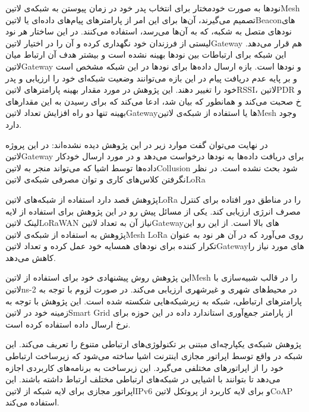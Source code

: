 نودها به صورت خودمختار برای انتخاب پدر خود در زمان پیوستن به شبکه‌ی ‌لاتین{Mesh} تصمیم می‌گیرند، آن‌ها برای این امر از پارامترهای پیام‌های داده‌ای یا ‌لاتین{Beacon}های نودهای متصل به شکبه، که به آن‌ها می‌رسد، استفاده می‌کنند.
در این ساختار هر نود لیستی از فرزندان خود نگهداری کرده و آن را در اختیار ‌لاتین{‌Gateway} هم قرار می‌دهد.
این شبکه برای ارتباطات بین نودها بهینه نشده است و بیشتر هدف آن ارتباط میان ‌لاتین{Gateway} و نودها است.
بازه ارسال داده‌ها برای نودها در این شبکه مشخص است و بر پایه عدم دریافت پیام در این بازه می‌توانند وضعیت شبکه‌ای خود را ارزیابی و پدر خود را تغییر دهند.
این پژوهش در مورد مقدار بهینه پارامترهای ‌لاتین{RSSI}، ‌لاتین{PDR} و ‌خ صحبت می‌کند و همانطور که بیان شد، ادعا می‌کند که برای رسیدن به این مقدارهای بهینه تنها دو راه افزایش تعداد ‌لاتین{Gateway}ها یا استفاده از شبکه‌ی ‌لاتین{Mesh} وجود دارد.

در نهایت می‌توان گفت موارد زیر در این پژوهش دیده نشده‌اند:
 در این پروژه ‌لاتین{Gateway} برای دریافت داده‌ها به نودها درخواست می‌دهد و در مورد ارسال خودکار داده‌ها توسط اشیا که می‌تواند منجر به ‌لاتین{Collusion} شود بحث نشده است.
 در نظر نگرفتن کلاس‌های کاری و توان مصرفی شبکه‌ی ‌لاتین{LoRa}


پژوهش  قصد دارد استفاده از شبکه‌های ‌لاتین{LoRa} را در مناطق دور افتاده برای کنترل مصرف انرژی ارزیابی کند.
یکی از مسائل پیش رو در این پژوهش برای استفاده از لایه لینک ‌لاتین{LoRaWAN} نیاز آن به تعداد ‌لاتین{Gateway}های بالا است.
از این رو این پژوهش به استفاده از شبکه‌ی ‌لاتین{Mesh LoRa} روی می‌آورد که در آن هر نود به عنوان تکرار کننده برای نودهای همسایه خود عمل کرده
و تعداد ‌لاتین{Gateway}های مورد نیاز را کاهش می‌دهد.

این پژوهش روش پیشنهادی خود برای استفاده از ‌لاتین{Mesh} را در قالب شبیه‌سازی با ‌لاتین{ns-2} در محیط‌های شهری و غیرشهری ارزیابی می‌کند.
در صورت لزوم با توجه به پارامترهای ارتباطی، شبکه به زیرشبکه‌هایی شکسته شده است.
این پژوهش با توجه به زمینه خود در ‌لاتین{Smart Grid} از پارامتر جمع‌آوری استاندارد داده در این حوزه برای نرخ ارسال داده استفاده کرده است.



پژوهش  شبکه‌ی یکپارچه‌ای مبتنی بر تکنولوژی‌های ارتباطی متنوع را تعریف می‌کند. این شبکه در واقع توسط اپراتور مجازی اینترنت اشیا
ساخته می‌شود که زیرساخت ارتباطی خود را از اپراتورهای مختلفی می‌گیرد. این زیرساخت به برنامه‌های کاربردی اجازه می‌دهد تا بتوانند با اشیایی در شبکه‌های ارتباطی مختلف ارتباط داشته باشند.
این اپراتور مجازی برای لایه شبکه از ‌لاتین{IPv6} و برای لایه کاربرد از پروتکل ‌لاتین{CoAP} استفاده می‌کند.

